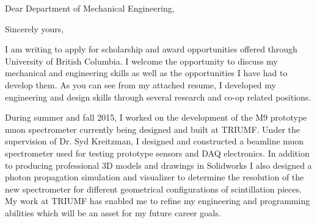 \documentclass[11pt,a4paper]{moderncv} %
\begin{document}


\clearpage


 




\date{\today} %

\opening{Dear 
Department of Mechanical Engineering,}
\closing{Sincerely yours,} %

\makelettertitle %
 

I am writing to apply for scholarship and award opportunities offered through University of British Columbia. I welcome the opportunity to discuss my mechanical and engineering skills as well as the opportunities I have had to develop them. As you can see from my attached resume, I developed my engineering and design skills through several research and co-op related positions.

During summer and fall 2015, I worked on the development of the M9 prototype muon spectrometer currently being designed and built at TRIUMF. Under the supervision of Dr. Syd Kreitzman, I designed and constructed a beamline muon spectrometer used for testing prototype sensors and DAQ electronics. In addition to producing professional 3D models and drawings in Solidworks I also designed a photon propagation simulation and visualizer to determine the resolution of the new spectrometer for different geometrical configurations of scintillation pieces. My work at TRIUMF has enabled me to refine my engineering and programming abilities which will be an asset for my future career goals.%
\end{document}

